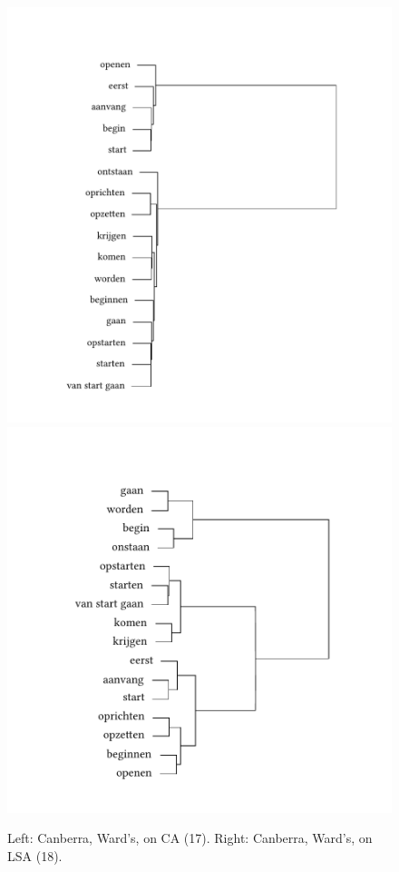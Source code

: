 \begin{figure}
\includegraphics[width=.48\textwidth,trim=95 40 75 75]{figures/tree46.pdf}\hfill%
\includegraphics[width=.48\textwidth,trim=95 40 75 75]{figures/tree47.pdf}
\caption{\label{fig:3:46}Left: Canberra, Ward’s, on CA (17). Right:\label{fig:3:47} Canberra, Ward’s, on LSA (18).}
\end{figure}

\clearpage
